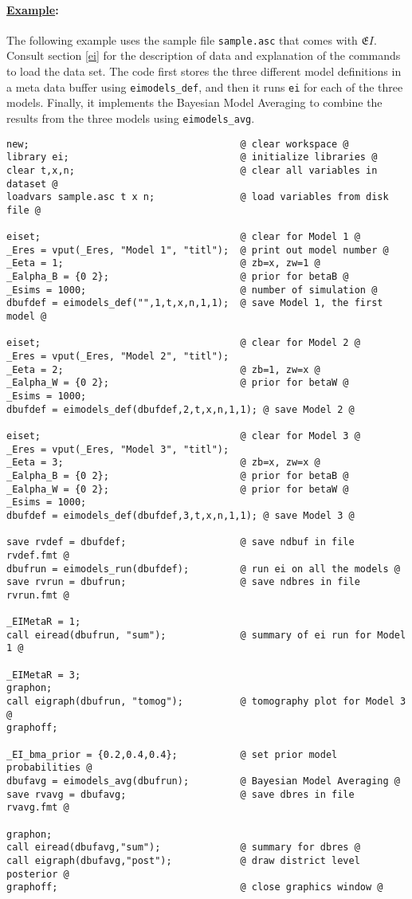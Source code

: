 \documentclass[11pt,titlepage]{article}
\newcommand{\EI}{\ensuremath{{\mathfrak EI}}}
\begin{document}
\paragraph{\underline{Example}:}
The following example uses the sample file \texttt{sample.asc} that
comes with \EI.  Consult section \ref{ei} for the description of data
and explanation of the commands to load the data set. The code first
stores the three different model definitions in a meta data buffer
using \texttt{eimodels\_def}, and then it runs \texttt{ei} for each of
the three models. Finally, it implements the Bayesian Model Averaging
to combine the results from the three models using
\texttt{eimodels\_avg}.
\begin{verbatim}
new;                                     @ clear workspace @
library ei;                              @ initialize libraries @
clear t,x,n;                             @ clear all variables in dataset @
loadvars sample.asc t x n;               @ load variables from disk file @

eiset;                                   @ clear for Model 1 @
_Eres = vput(_Eres, "Model 1", "titl");  @ print out model number @
_Eeta = 1;                               @ zb=x, zw=1 @
_Ealpha_B = {0 2};                       @ prior for betaB @
_Esims = 1000;                           @ number of simulation @
dbufdef = eimodels_def("",1,t,x,n,1,1);  @ save Model 1, the first model @

eiset;                                   @ clear for Model 2 @
_Eres = vput(_Eres, "Model 2", "titl");
_Eeta = 2;                               @ zb=1, zw=x @
_Ealpha_W = {0 2};                       @ prior for betaW @
_Esims = 1000;
dbufdef = eimodels_def(dbufdef,2,t,x,n,1,1); @ save Model 2 @

eiset;                                   @ clear for Model 3 @
_Eres = vput(_Eres, "Model 3", "titl");
_Eeta = 3;                               @ zb=x, zw=x @
_Ealpha_B = {0 2};                       @ prior for betaB @
_Ealpha_W = {0 2};                       @ prior for betaW @
_Esims = 1000;
dbufdef = eimodels_def(dbufdef,3,t,x,n,1,1); @ save Model 3 @

save rvdef = dbufdef;                    @ save ndbuf in file rvdef.fmt @
dbufrun = eimodels_run(dbufdef);         @ run ei on all the models @
save rvrun = dbufrun;                    @ save ndbres in file rvrun.fmt @

_EIMetaR = 1;
call eiread(dbufrun, "sum");             @ summary of ei run for Model 1 @

_EIMetaR = 3;
graphon;
call eigraph(dbufrun, "tomog");          @ tomography plot for Model 3 @
graphoff;

_EI_bma_prior = {0.2,0.4,0.4};           @ set prior model probabilities @
dbufavg = eimodels_avg(dbufrun);         @ Bayesian Model Averaging @
save rvavg = dbufavg;                    @ save dbres in file rvavg.fmt @

graphon;
call eiread(dbufavg,"sum");              @ summary for dbres @
call eigraph(dbufavg,"post");            @ draw district level posterior @
graphoff;                                @ close graphics window @
\end{verbatim} 
\end{document}
